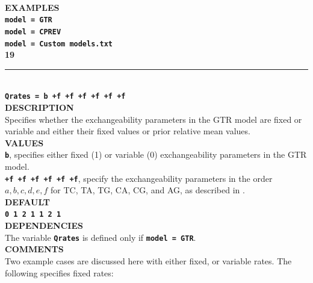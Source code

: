 \documentclass[a4paper]{book}
\numberwithin{equation}{section} \renewcommand{\baselinestretch}{0.55}
\begin{document}
\vspace{5pt}\\
\textbf{EXAMPLES} \vspace{5pt}\\
\textbf{\texttt{model = GTR}} \vspace{5pt}\\
\textbf{\texttt{model = CPREV}}\vspace{5pt}\\
\textbf{\texttt{model = Custom models.txt}}\vspace{10pt}\\
\textbf{{\large 19}} \\
\noindent\rule{\textwidth}{0.8pt} \\
\textbf{{\Large \texttt{Qrates = b +f +f +f +f +f +f}}} \vspace{5pt}\\
\textbf{DESCRIPTION} \vspace{5pt}\\
Specifies whether the exchangeability parameters in the GTR model are
fixed or variable and
either their fixed values or prior relative mean values. \vspace{5pt}\\
\textbf{VALUES} \vspace{5pt}\\
\textbf{\texttt{b}}, specifies either fixed (1) or variable (0) exchangeability parameters in the GTR model. \vspace{5pt}\\
\textbf{\texttt{+f +f +f +f +f +f}}, specify the exchangeability
parameters in the order $a, b, c, d, e, f$ for TC, TA, TG, CA, CG, and
AG, as described in \citealt{Yang1994a}.
\vspace{5pt}\\
\textbf{DEFAULT} \vspace{5pt}\\
\textbf{\texttt{0 1 2 1 1 2 1}} \vspace{5pt}\\
\textbf{DEPENDENCIES} \vspace{5pt}\\
The variable \textbf{\texttt{Qrates}} is defined only if
\textbf{\texttt{model = GTR}}.
\vspace{5pt}\\
\textbf{COMMENTS} \vspace{5pt}\\
Two example cases are discussed here with either fixed, or variable
rates.  The following specifies fixed rates:
\end{document}
